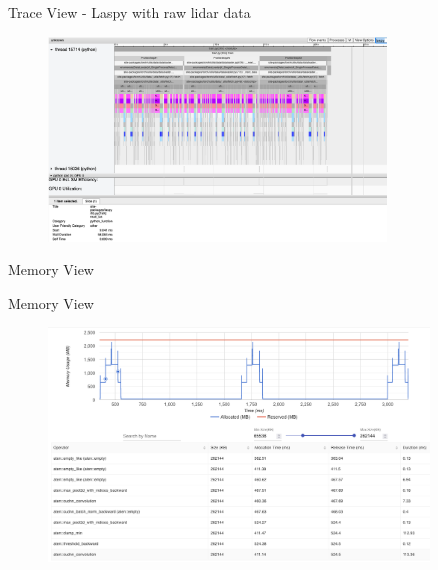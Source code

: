 \documentclass[compress,aspectratio=169]{beamer}
\begin{document}
\begin{frame}{Trace View - Laspy with raw lidar data}
    \vspace{-1em}
\begin{center}
    \begin{figure}
        \includegraphics[width=0.8\textwidth]{../../data/scap_gtx1080_profiler-torch_sample-points_14650750_trace-view-laspy}
    \end{figure}
    \end{center}
\end{frame}

\begin{frame}
\begin{center}
Memory View
\end{center}
\end{frame}

\begin{frame}{Memory View}
    \vspace{-1em}
\begin{center}
    \begin{figure}
        \includegraphics[width=0.9\textwidth]{../../data/scap_gtx1080_profiler-torch_batch-size-64_14650758_memory-view}
    \end{figure}
    \end{center}
\end{frame}
\end{document}
